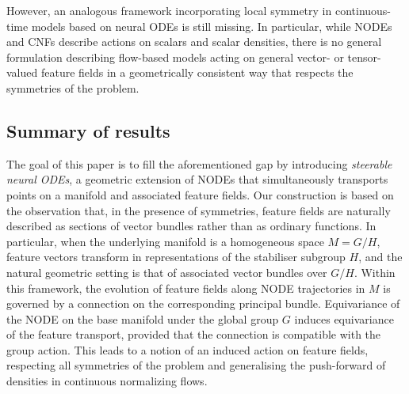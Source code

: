 \documentclass[12pt,a4paper]{article}
\numberwithin{equation}{section}
\theoremstyle{plain}
\theoremstyle{definition}
\theoremstyle{remark}
\begin{document}
However, an analogous framework incorporating local symmetry in continuous-time models based on neural ODEs is still missing.
In particular, while NODEs and CNFs describe actions on scalars and scalar densities, there is no general formulation describing flow-based models acting on general vector- or tensor-valued feature fields in a geometrically consistent way that respects the symmetries of the problem.

\subsection{Summary of results}
\label{sec:intro_summary}
The goal of this paper is to fill the aforementioned gap by introducing \emph{steerable neural ODEs}, a geometric extension of NODEs that simultaneously transports points on a manifold and associated feature fields. Our construction is based on the observation that, in the presence of symmetries, feature fields are naturally described as sections of vector bundles rather than as ordinary functions. In particular, when the underlying manifold is a homogeneous space $M = G/H$, feature vectors transform in representations of the stabiliser subgroup $H$, and the natural geometric setting is that of associated vector bundles over $G/H$. Within this framework, the evolution of feature fields along NODE trajectories in $M$ is governed by a connection on the corresponding principal bundle. Equivariance of the NODE on the base manifold under the global group $G$ induces equivariance of the feature transport, provided that the connection is compatible with the group action. This leads to a notion of an induced action on feature fields, respecting all symmetries of the problem and generalising the push-forward of densities in continuous normalizing flows.
\end{document}
